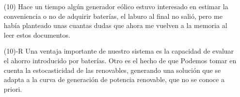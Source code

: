 \documentclass[12pt]{article}
\theoremstyle{definition}
\theoremstyle{remark}
\begin{document}
\begin{enumerate}
\item[(10)] Hace un tiempo alg\'un generador e\'olico estuvo interesado en estimar la conveniencia o no de adquirir bater\'ias, el laburo al final no sali\'o, pero me hab\'ia planteado unas cuantas dudas que ahora me vuelven a la memoria al leer estos documentos. 

\item[(10)-R] Una ventaja importante de nuestro sistema es la capacidad de evaluar el ahorro introducido por bater\'ias. Otro es el hecho de que Podemos tomar en cuenta la estocasticidad de las renovables, generando una soluci\'on que se adapta a la curva de generaci\'on de potencia renovable, que no se conoce a priori.

\end{enumerate}
\end{document}
